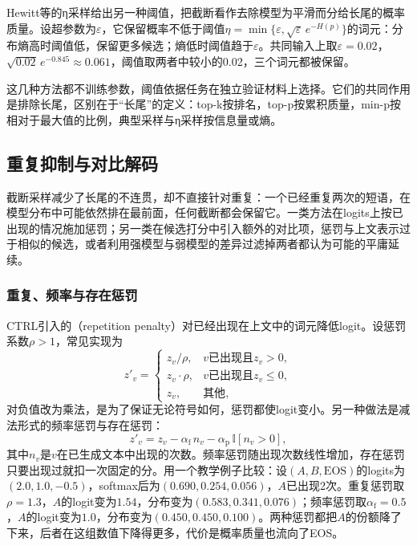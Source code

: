 Hewitt等的η采样给出另一种阈值，把截断看作去除模型为平滑而分给长尾的概率质量。设超参数为$\varepsilon$，它保留概率不低于阈值$\eta=\min\{\varepsilon,\sqrt{\varepsilon}\,e^{-H(p)}\}$的词元：分布熵高时阈值低，保留更多候选；熵低时阈值趋于$\varepsilon$。共同输入上取$\varepsilon=0.02$，$\sqrt{0.02}\,e^{-0.845}\approx0.061$，阈值取两者中较小的0.02，三个词元都被保留。

这几种方法都不训练参数，阈值依据任务在独立验证材料上选择。它们的共同作用是排除长尾，区别在于“长尾”的定义：top-k按排名，top-p按累积质量，min-p按相对于最大值的比例，典型采样与η采样按信息量或熵。

\subsection{重复抑制与对比解码}
\label{sec:nlp-inference-repetition}

截断采样减少了长尾的不连贯，却不直接针对重复：一个已经重复两次的短语，在模型分布中可能依然排在最前面，任何截断都会保留它。一类方法在logits上按已出现的情况施加惩罚；另一类在候选打分中引入额外的对比项，惩罚与上文表示过于相似的候选，或者利用强模型与弱模型的差异过滤掉两者都认为可能的平庸延续。

\subsubsection{重复、频率与存在惩罚}
\label{sec:nlp-inference-penalties}

CTRL引入的（repetition penalty）对已经出现在上文中的词元降低logit。设惩罚系数$\rho>1$，常见实现为
\begin{equation}
 z'_v=\begin{cases}
  z_v/\rho, & v\text{已出现且}z_v>0,\\
  z_v\cdot\rho, & v\text{已出现且}z_v\leq0,\\
  z_v, & \text{其他},
 \end{cases}
 \label{eq:nlp-inference-repetition-penalty}
\end{equation}
对负值改为乘法，是为了保证无论符号如何，惩罚都使logit变小。另一种做法是减法形式的频率惩罚与存在惩罚：
\begin{equation}
 z'_v=z_v-\alpha_{\mathrm f}\,n_v-\alpha_{\mathrm p}\,\mathbb I[n_v>0],
 \label{eq:nlp-inference-frequency-penalty}
\end{equation}
其中$n_v$是$v$在已生成文本中出现的次数。频率惩罚随出现次数线性增加，存在惩罚只要出现过就扣一次固定的分。用一个教学例子比较：设$(A,B,\mathrm{EOS})$的logits为$(2.0,1.0,-0.5)$，softmax后为$(0.690,0.254,0.056)$，$A$已出现2次。重复惩罚取$\rho=1.3$，$A$的logit变为$1.54$，分布变为$(0.583,0.341,0.076)$；频率惩罚取$\alpha_{\mathrm f}=0.5$，$A$的logit变为$1.0$，分布变为$(0.450,0.450,0.100)$。两种惩罚都把$A$的份额降了下来，后者在这组数值下降得更多，代价是概率质量也流向了EOS。

